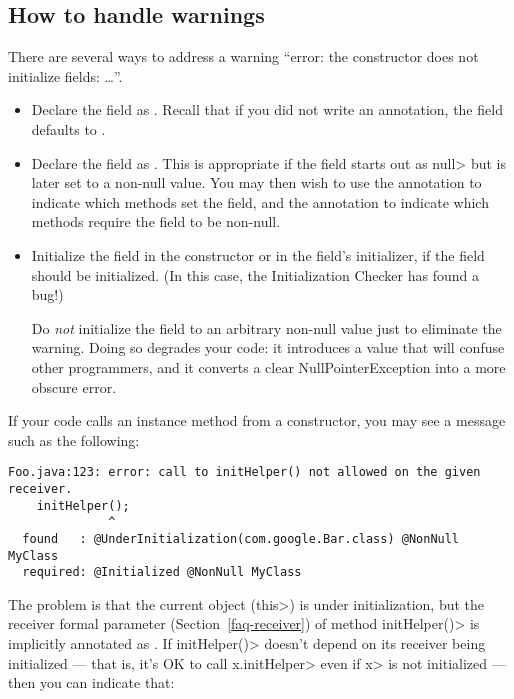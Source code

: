 \subsection{How to handle warnings\label{initialization-warnings}}

There are several ways to address a warning ``error:  the constructor does
not initialize fields: \ldots''.
\begin{itemize}
\item
  Declare the field as .  Recall
  that if you did not write an annotation, the field defaults to
  .
\item
  Declare the field as .
  This is appropriate if the field starts out as \<null> but is later set
  to a non-null value.  You may then wish to use the
   annotation to indicate
  which methods set the field, and the
   annotation to indicate
  which methods require the field to be non-null.
\item
  Initialize the field in the constructor or in the field's initializer, if 
  the field should be initialized.  (In this case, the Initialization
  Checker has found a bug!)

  Do \emph{not} initialize the field to an arbitrary non-null value just to
  eliminate the warning.  Doing so degrades your code:  it introduces a
  value that will confuse other programmers, and it converts a clear
  NullPointerException into a more obscure error.
\end{itemize}

If your code calls an instance method from a constructor, you may see a
message such as the following:

\begin{Verbatim}
Foo.java:123: error: call to initHelper() not allowed on the given receiver.
    initHelper();
              ^
  found   : @UnderInitialization(com.google.Bar.class) @NonNull MyClass
  required: @Initialized @NonNull MyClass
\end{Verbatim}

The problem is that the current object (\<this>) is under initialization,
but the receiver formal parameter (Section~\ref{faq-receiver}) of method
\<initHelper()> is implicitly annotated as
.  If
\<initHelper()> doesn't depend on its receiver being initialized --- that
is, it's OK to call \<x.initHelper> even if \<x> is not initialized ---
then you can indicate that:


